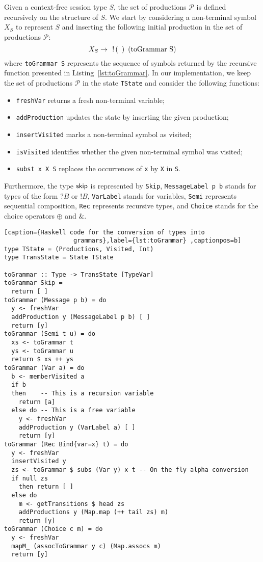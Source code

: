 Given a context-free session type $S$, the set of productions $\mathcal{P}$
is defined recursively on the structure of $S$. We start by considering 
a non-terminal symbol $X_S$ to represent $S$ and inserting the following 
initial production in the set of productions $\mathcal{P}$: 
\begin{equation}
\label{initial_prod}
	X_S \rightarrow \enspace \initialProd\enspace \text{(\lstinline{toGrammar S})}	
\end{equation}
where \lstinline{toGrammar S} represents the sequence of symbols returned by the
recursive function presented in Listing~\ref{lst:toGrammar}. In our implementation, 
we keep the set of productions $\mathcal{P}$ in the state \lstinline{TState}
and consider the following functions:
\begin{itemize}
	\item \lstinline{freshVar} returns a fresh non-terminal variable;
	\item \lstinline{addProduction} updates the state by inserting 
	      the given production;
	\item \lstinline{insertVisited} marks a non-terminal symbol as visited;
	\item \lstinline{isVisited} identifies whether the given non-terminal symbol 
	      was visited;
	\item \lstinline{subst x X S} replaces the occurrences of \lstinline{x} by 
	      \lstinline{X} in \lstinline{S}.
\end{itemize}
Furthermore, the type $\mathsf{skip}$ is represented by \lstinline{Skip}, 
\lstinline{MessageLabel p b} stands for types of the form $?B$ or $!B$,
\lstinline{VarLabel} stands for variables, 
\lstinline{Semi} represents sequential composition,
\lstinline{Rec} represents recursive types, and
\lstinline{Choice} stands for the choice operators $\oplus$ and $\&$.

\begin{lstlisting}[caption={Haskell code for the conversion of types into
                   grammars},label={lst:toGrammar} ,captionpos=b]
type TState = (Productions, Visited, Int)
type TransState = State TState

toGrammar :: Type -> TransState [TypeVar]
toGrammar Skip =
  return [ ]
toGrammar (Message p b) = do
  y <- freshVar
  addProduction y (MessageLabel p b) [ ]
  return [y]
toGrammar (Semi t u) = do
  xs <- toGrammar t
  ys <- toGrammar u
  return $ xs ++ ys
toGrammar (Var a) = do
  b <- memberVisited a
  if b
  then    -- This is a recursion variable
    return [a]
  else do -- This is a free variable
    y <- freshVar
    addProduction y (VarLabel a) [ ]
    return [y]
toGrammar (Rec Bind{var=x} t) = do
  y <- freshVar
  insertVisited y
  zs <- toGrammar $ subs (Var y) x t -- On the fly alpha conversion
  if null zs
    then return [ ]
  else do
    m <- getTransitions $ head zs
    addProductions y (Map.map (++ tail zs) m)
    return [y]
toGrammar (Choice c m) = do
  y <- freshVar
  mapM_ (assocToGrammar y c) (Map.assocs m)
  return [y]
\end{lstlisting}


